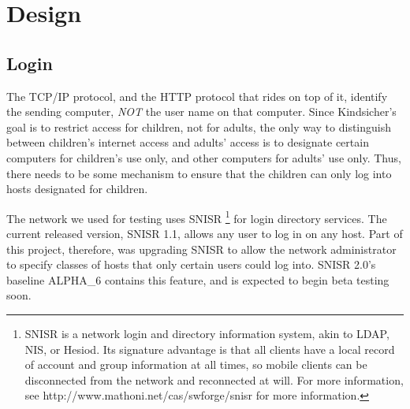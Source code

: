 
\section{Design}




\subsection{Login}

The TCP/IP protocol, and the HTTP protocol that rides on top of it, identify
the sending computer, \emph{NOT} the user name on that computer.  
% 
Since Kindsicher's goal is to restrict access for children, not for adults,
the only way to distinguish between children's internet access and adults'
access is to designate certain computers for children's use only, and other
computers for adults' use only.  
%
Thus, there needs to be some mechanism to ensure that the children can only
log into hosts designated for children.

The network we used for testing uses SNISR 
%
\footnote{ SNISR is a network login and directory information system, akin to
LDAP, NIS, or Hesiod.  Its signature advantage is that all clients have a
local record of account and group information at all times, so mobile clients
can be disconnected from the network and reconnected at will.  For more
information, see http://www.mathoni.net/cas/swforge/snisr for more
information. }
%
for login directory services.  
%
The current released version, SNISR 1.1, allows any user to log in on any host.  
%
Part of this project, therefore, was upgrading SNISR to allow the network
administrator to specify classes of hosts that only certain users could log
into.
%
SNISR 2.0's baseline ALPHA_6 contains this feature, and is expected to begin
beta testing soon.


